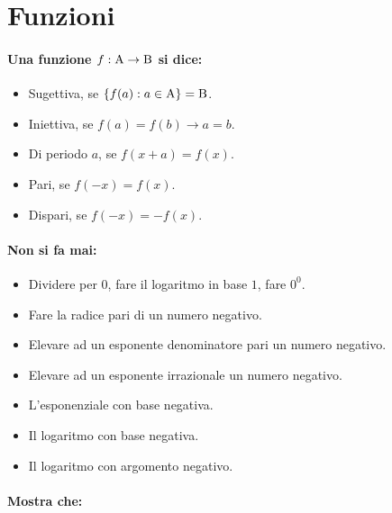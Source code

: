 \documentclass{article}
\begin{document}
\newpage
\section*{Funzioni}

\paragraph{Una funzione $f: {\rm A} \rightarrow {\rm B}$ si dice:}

\begin{itemize}
\item Sugettiva, se $\{f(a): a \in {\rm A}\} = {\rm B}$.
\item Iniettiva, se $f(a) = f(b) \longrightarrow a = b$.
\item Di periodo $a$, se $f(x + a) = f(x)$.
\item Pari, se $f(- x) = f(x)$.
\item Dispari, se $f(- x) = - f(x)$.
\end{itemize}

\paragraph{Non si fa mai:}

\begin{itemize}
\item Dividere per $0$, fare il logaritmo in base $1$, fare $0^0$.
\item Fare la radice pari di un numero negativo.
\item Elevare ad un esponente denominatore pari un numero negativo.
\item Elevare ad un esponente irrazionale un numero negativo.
\item L'esponenziale con base negativa.
\item Il logaritmo con base negativa.
\item Il logaritmo con argomento negativo.
\end{itemize}

\paragraph{Mostra che:}
\end{document}
